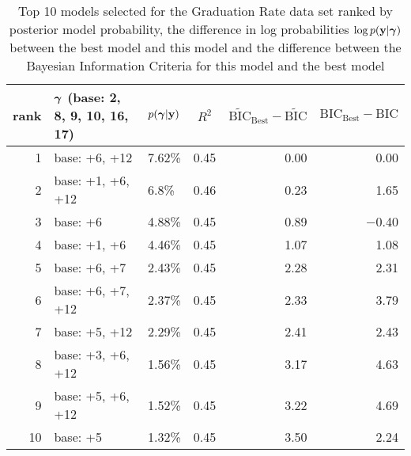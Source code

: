 \documentclass{amsart}
\begin{document}
\begin{table}
\label{tab:numerical_results_gradrate}
\caption{Top 10 models selected for the Graduation Rate data set ranked by posterior model probability, the
					difference in log probabilities $\log p({\bf y}|{\boldsymbol \gamma})$ between the best model and this model and the difference between the Bayesian Information Criteria for this model and the best model}
\begin{center}
\begin{tabular}{r|l|l|c|r|r}
rank & ${\boldsymbol \gamma}$ (base: 2, 8, 9, 10, 16, 17) & $p({\boldsymbol \gamma}|{\bf y})$ & $R^2$ & $\widetilde{\text{BIC}}_\text{Best} - \widetilde{\text{BIC}}$ & $\text{BIC}_\text{Best} - \text{BIC}$ \\
\hline
1 & base: +6, +12&  7.62\%&  0.45&  0.00&  0.00\\
2 & base: +1, +6, +12&  6.8\%&  0.46&  0.23&  1.65\\
3 & base: +6&  4.88\%&  0.45&  0.89&  $-$0.40\\
4 & base: +1, +6&  4.46\%&  0.45&  1.07&  1.08\\
5 & base: +6, +7&  2.43\%&  0.45&  2.28&  2.31\\
6 & base: +6, +7, +12&  2.37\%&  0.45&  2.33&  3.79\\
7 & base: +5, +12&  2.29\%&  0.45&  2.41&  2.43\\
8 & base: +3, +6, +12&  1.56\%&  0.45&  3.17&  4.63\\
9 & base: +5, +6, +12&  1.52\%&  0.45&  3.22&  4.69\\
10 &base:  +5&  1.32\%&  0.45&  3.50&  2.24\\
\end{tabular}
\end{center}
\end{table}
\end{document}
